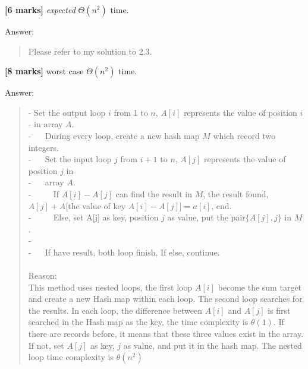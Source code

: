 \documentclass{article}
\begin{document}
\begin{Question}
\begin{Subquestion}
\textbf{[6 marks]} \emph{expected} $\Theta(n^2)$ time.
\begin{answer}
Answer:
\begin{quote}
    Please refer to my solution to 2.3.\\
\end{quote}
\end{answer}
\end{Subquestion}

\clearpage
\begin{Subquestion}
\textbf{[8 marks]} worst case $\Theta(n^2)$ time.
\begin{answer}
Answer:
\begin{quote}
    - Set the output loop $i$ from 1 to $n$, $A[i]$ represents the value of position $i$\\- in array $A$.\\
    - $\quad$ During every loop, create a new hash map $M$ which record two integers.\\
    - $\quad$ Set the input loop $j$ from $i + 1$ to $n$, $A[j]$ represents the value of position $j$ in \\- $\quad$ array $A$.\\
    - $\quad \quad$ If $A[i] - A[j]$ can find the result in $M$, the result found, $A[j] + A[$the value of key $A[i] - A[j]] = a[i]$, end.\\
    - $\quad \quad$ Else, set A[j] as key, position $j$ as value, put the pair$\{A[j], j\}$ in $M$.\\
    - $\quad \quad$\\
    - $\quad$ If have result, both loop finish, If else, continue.\\\\
    Reason:\\
    This method uses nested loops, the first loop $A[i]$ become the sum target and create a new Hash map within each loop. The second loop searches for the results. In each loop, the difference between $A[i]$ and $A[j]$ is first searched in the Hash map as the key, the time complexity is $\theta(1)$. If there are records before, it means that these three values exist in the array. If not, set $A[j]$ as key, $j$ as value, and put it in the hash map. The nested loop time complexity is $\theta(n^2)$\\
\end{quote}
\end{answer}
\end{Subquestion}
\end{Question}
\end{document}

